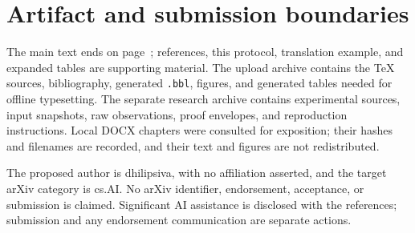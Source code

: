 \begin{table}[h]
\centering\small

\caption{Measured process and answer ledger. U denotes \Unknown;
R denotes an engine \Resource\ result. Failures exclude external cutoffs.}
\label{tab:ledger}
\end{table}

\begin{table}[h]
\centering\small

\caption{External cutoffs grouped by the last completed phase, where available. An
\texttt{open} row has no completed load observation. RSS is the median peak
observed up to termination, not a completed workload's memory requirement.}
\end{table}

\begin{table}[h]
\centering\footnotesize

\caption{Every chain cell. Values are milliseconds with first and third quartiles.
A dagger marks any externally timed-out sample in the cell. Exact cutoff
counts and individual samples are in \texttt{generated/summary.csv}.}
\end{table}

\section{Artifact and submission boundaries}

The main text ends on page~\pageref{main-end}; references, this protocol,
translation example, and expanded tables are supporting material.
The upload archive contains the TeX sources, bibliography, generated
\texttt{.bbl}, figures, and generated tables needed for offline typesetting.
The separate research archive contains experimental sources, input snapshots,
raw observations, proof envelopes, and reproduction instructions.
Local DOCX chapters were consulted for exposition; their hashes and filenames
are recorded, and their text and figures are not redistributed.

The proposed author is dhilipsiva, with no affiliation asserted, and the
target arXiv category is cs.AI. No arXiv identifier, endorsement, acceptance,
or submission is claimed. Significant AI assistance is disclosed with the
references; submission and any endorsement communication are separate actions.

